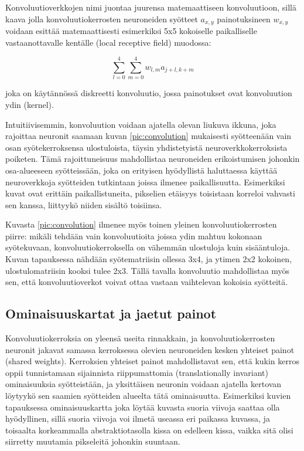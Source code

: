 \documentclass[finnish]{tktltiki2}
\theoremstyle{definition}
\theoremstyle{remark}
\begin{document}
    Konvoluutioverkkojen nimi juontaa juurensa matemaattiseen konvoluutioon, sillä kaava jolla konvoluutiokerrosten neuroneiden syötteet $a_{x,y}$ painotuksineen $w_{x,y}$ voidaan esittää matemaattisesti esimerkiksi 5x5 kokoiselle paikalliselle vastaanottavalle kentälle (local receptive field) muodossa:

    $$ \sum_{l=0}^{4}\sum_{m=0}^{4} w_{l,m}a_{j+l,k+m}$$
    
    joka on käytännössä diskreetti konvoluutio, jossa painotukset ovat konvoluution ydin (kernel).

    Intuitiivisemmin, konvoluution voidaan ajatella olevan liukuva ikkuna, joka rajoittaa neuronit saamaan kuvan \ref{pic:convolution} mukaisesti syötteenään vain osan syötekerroksensa ulostuloista, täysin yhdistetyistä neuroverkkokerroksista poiketen. Tämä rajoittuneisuus mahdollistaa neuroneiden erikoistumisen johonkin osa-alueeseen syötteissään, joka on erityisen hyödyllistä haluttaessa käyttää neuroverkkoja syötteiden tutkintaan joissa ilmenee paikallisuutta. Esimerkiksi kuvat ovat erittäin paikallistuneita, pikselien etäisyys toisistaan korreloi vahvasti sen kanssa, liittyykö niiden sisältö toisiinsa.

    Kuvasta \ref{pic:convolution} ilmenee myös toinen yleinen konvoluutiokerrosten piirre: mikäli tehdään vain konvoluutioita joissa ydin mahtuu kokonaan syötekuvaan, konvoluutiokerroksella on vähemmän ulostuloja kuin sisääntuloja. Kuvan tapauksessa nähdään syötematriisin ollessa 3x4, ja ytimen 2x2 kokoinen, ulostulomatriisin kooksi tulee 2x3. Tällä tavalla konvoluutio mahdollistaa myös sen, että konvoluutioverkot voivat ottaa vastaan vaihtelevan kokoisia syötteitä.

    \subsection{Ominaisuuskartat ja jaetut painot}

    Konvoluutiokerroksia on yleensä useita rinnakkain, ja konvoluutiokerrosten neuronit jakavat samassa kerroksessa olevien neuroneiden kesken yhteiset painot (shared weights). Kerroksien yhteiset painot mahdollistavat sen, että kukin kerros oppii tunnistamaan sijainnista riippumattomia (translationally invariant) ominaisuuksia syötteistään, ja yksittäisen neuronin voidaan ajatella kertovan löytyykö sen saamien syötteiden alueelta tätä ominaisuutta. Esimerkiksi kuvien tapauksessa ominaisuuskartta joka löytää kuvasta suoria viivoja saattaa olla hyödyllinen, sillä suoria viivoja voi ilmetä useassa eri paikassa kuvassa, ja toisaalta korkeammalla abstraktiotasolla kissa on edelleen kissa, vaikka sitä olisi siirretty muutamia pikseleitä johonkin suuntaan.
\end{document}

